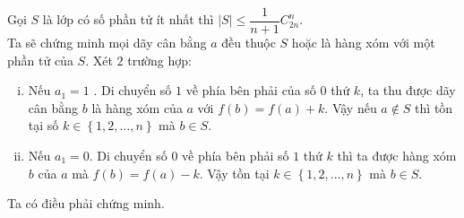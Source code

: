 \begin{bt}
{		Gọi $S$ là lớp có số phần tử ít nhất thì $\left| S\right| \leq \dfrac{1}{n+1}C^n_{2n}$.\\
		Ta sẽ chứng minh mọi dãy cân bằng $a$ đều thuộc $S$ hoặc là hàng xóm với một phần tử của $S$. Xét $2$ trường hợp:
		\begin{enumerate}[i)]
			\item Nếu $a_1 = 1$ . Di chuyển số $1$ về phía bên phải của số $0$ thứ $k$, ta thu được dãy cân bằng $b$ là hàng xóm của $a$ với $f(b) = f(a) + k$. Vậy nếu $a\notin S$ thì tồn tại số $k \in \left\lbrace 1, 2,\ldots, n\right\rbrace $  mà  $b \in S$.
			\item Nếu $a_1=0$. Di chuyển số $0$ về phía bên phải số $1$ thứ $k$ thì ta được hàng xóm $b$ của $a$ mà $f(b) = f(a) - k$. Vậy tồn tại $k \in \left\lbrace 1, 2,\ldots, n\right\rbrace $ mà $b \in S$.
		\end{enumerate}	
		Ta có điều phải chứng minh.
	}
\end{bt}


